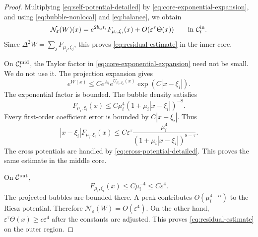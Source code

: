 \documentclass[11pt]{article}
\numberwithin{equation}{section}
\begin{document}
\begin{proof}
Multiplying \eqref{eq:self-potential-detailed} by \eqref{eq:core-exponential-expansion}, and using \eqref{eq:bubble-nonlocal} and \eqref{eq:balance}, we obtain
\begin{equation}\label{eq:core-nonlinearity}
\mathcal N_\varepsilon(W)(x)
=e^{2b_\alpha t_i}F_{\mu_i,\xi_i}(x)
+O(\varepsilon^\tau\Theta(x))
\qquad\hbox{in }\mathcal C_i^{\rm in}.
\end{equation}
Since
$\Delta^2W=\sum_jF_{\mu_j,\xi_j}$, this proves
\eqref{eq:residual-estimate} in the inner core.

On $\mathcal C_i^{\rm mid}$, the Taylor factor in
\eqref{eq:core-exponential-expansion} need not be small. We do not use it. The projection expansion gives
\[
e^{W(x)}\leq C e^{A_i}e^{U_{\mu_i,\xi_i}(x)}
\exp(C|x-\xi_i|).
\]
The exponential factor is bounded. The bubble density satisfies
\[
F_{\mu_i,\xi_i}(x)
\leq C\mu_i^4(1+\mu_i|x-\xi_i|)^{-8}.
\]
Every first-order coefficient error is bounded by
$C|x-\xi_i|$. Thus
\[
|x-\xi_i|F_{\mu_i,\xi_i}(x)
\leq C\varepsilon^\tau
\frac{\mu_i^4}{(1+\mu_i|x-\xi_i|)^{8-\tau}}.
\]
The cross potentials are handled by \eqref{eq:cross-potential-detailed}. This proves the same estimate in the middle core.

On $\mathcal C^{\rm out}$,
\[
F_{\mu_i,\xi_i}(x)\leq C\mu_i^{-4}\leq C\varepsilon^4.
\]
The projected bubbles are bounded there. A peak contributes
$O(\mu_i^{4-\alpha})$ to the Riesz potential. Therefore
$\mathcal N_\varepsilon(W)=O(\varepsilon^4)$. On the other hand,
$\varepsilon^\tau\Theta(x)\geq c\varepsilon^4$ after the constants are adjusted. This proves \eqref{eq:residual-estimate} on the outer region.


\end{proof}
\end{document}
